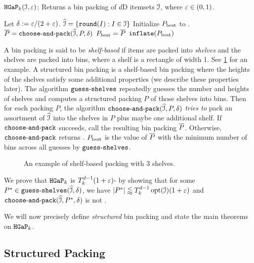 \begin{algorithm}[!ht]
\caption{$\operatorname{\mathtt{HGaP}}_k(\mathcal{I}, \varepsilon)$: Returns a bin packing of $d$D itemsets $\mathcal{I}$,
where $\varepsilon \in (0, 1)$.}
\label{algo:hgap}
\begin{algorithmic}[1]
\State Let $\delta := \varepsilon/(2+\varepsilon)$.
\State \label{alg-line:hgap:round}$\widehat{\mathcal{I}} = \{\operatorname{\mathtt{round}}(I): I \in \mathcal{I}\}$
\State Initialize $P_{\mathrm{best}}$ to \Null.
    \State $\overline{P} = \operatorname{\mathtt{choose-and-pack}}(\widehat{\mathcal{I}}, P, \delta)$
        \State $P_{\mathrm{best}} = \overline{P}$
    \EndIf
\EndFor
\State \Return $\operatorname{\mathtt{inflate}}(P_{\mathrm{best}})$
\end{algorithmic}
\end{algorithm}

A bin packing is said to be \emph{shelf-based} if items are packed into \emph{shelves}
and the shelves are packed into bins, where a shelf is a rectangle of width 1.
See \cref{fig:shelf-based-2} for an example.
A structured bin packing is a shelf-based bin packing
where the heights of the shelves satisfy some additional properties
(we describe these properties later).
The algorithm $\operatorname{\mathtt{guess-shelves}}$ repeatedly guesses the number and heights of shelves
and computes a structured packing $P$ of those shelves into bins.
Then for each packing $P$, the algorithm $\operatorname{\mathtt{choose-and-pack}}(\widehat{\mathcal{I}}, P, \delta)$ \emph{tries to}
pack an assortment of $\widehat{\mathcal{I}}$ into the shelves in $P$ plus maybe one additional shelf.
If $\operatorname{\mathtt{choose-and-pack}}$ succeeds, call the resulting bin packing $\overline{P}$.
Otherwise, $\operatorname{\mathtt{choose-and-pack}}$ returns \Null.
$P_{\mathrm{best}}$ is the value of $\overline{P}$ with the minimum number of bins
across all guesses by $\operatorname{\mathtt{guess-shelves}}$.

\begin{figure}[!ht]
\centering

\caption{An example of shelf-based packing with 3 shelves.}
\label{fig:shelf-based-2}
\end{figure}

We prove that $\operatorname{\mathtt{HGaP}}_k$ is $T_k^{d-1}(1+\varepsilon)$-\asymAppx{} by showing that
for some $P^* \in \operatorname{\mathtt{guess-shelves}}(\widehat{\mathcal{I}}, \delta)$,
we have $|P^*| \lessapprox T_k^{d-1}\operatorname{opt}(\mathcal{I})(1+\varepsilon)$
and $\operatorname{\mathtt{choose-and-pack}}(\widehat{\mathcal{I}}, P^*, \delta)$ is not \Null.

We will now precisely define \emph{structured} bin packing
and state the main theorems on $\operatorname{\mathtt{HGaP}}_k$.

\subsection{Structured Packing}


